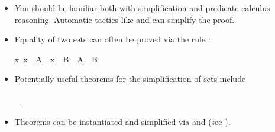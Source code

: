 \begin{isabellebody}
\begin{isamarkuptext}
\begin{itemize}
\item You should be familiar both with simplification and predicate
calculus reasoning. Automatic tactics like  and  can simplify the proof.

\item
Equality of two sets can often be proved via the rule :
\begin{isabelle}%
{\isacharparenleft}{\isasymAnd}x{\isachardot}\ {\isacharparenleft}x\ {\isasymin}\ A{\isacharparenright}\ {\isacharequal}\ {\isacharparenleft}x\ {\isasymin}\ B{\isacharparenright}{\isacharparenright}\ {\isasymLongrightarrow}\ A\ {\isacharequal}\ B%
\end{isabelle}

\item 
Potentially useful theorems for the simplification of sets include \\
~ \\
~.

\item 
Theorems can be instantiated and simplified via  and
 (see \cite{isabelle-tutorial}).
\end{itemize}%
\end{isamarkuptext}%
\isamarkuptrue%
\isamarkupfalse%
\end{isabellebody}%

